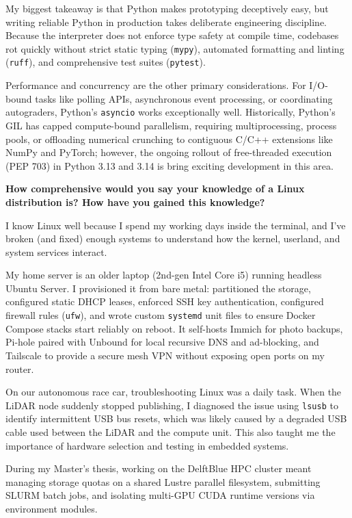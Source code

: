 \documentclass[letterpaper,11pt]{article}
\newcommand{\interviewQuestion}[1]{%
  \vspace{8pt}%
  \textbf{\color{airforceblue}#1}\par%
}
\begin{document}
My biggest takeaway is that Python makes prototyping deceptively easy, but writing reliable Python in production takes deliberate engineering discipline. Because the interpreter does not enforce type safety at compile time, codebases rot quickly without strict static typing (\texttt{mypy}), automated formatting and linting (\texttt{ruff}), and comprehensive test suites (\texttt{pytest}).

Performance and concurrency are the other primary considerations. For I/O-bound tasks like polling APIs, asynchronous event processing, or coordinating autograders, Python's \texttt{asyncio} works exceptionally well. Historically, Python's GIL has capped compute-bound parallelism, requiring multiprocessing, process pools, or offloading numerical crunching to contiguous C/C++ extensions like NumPy and PyTorch; however, the ongoing rollout of free-threaded execution (PEP 703) in Python 3.13 and 3.14 is bring exciting development in this area.

\interviewQuestion{How comprehensive would you say your knowledge of a Linux distribution is? How have you gained this knowledge?}

I know Linux well because I spend my working days inside the terminal, and I've broken (and fixed) enough systems to understand how the kernel, userland, and system services interact.

My home server is an older laptop (2nd-gen Intel Core i5) running headless Ubuntu Server. I provisioned it from bare metal: partitioned the storage, configured static DHCP leases, enforced SSH key authentication, configured firewall rules (\texttt{ufw}), and wrote custom \texttt{systemd} unit files to ensure Docker Compose stacks start reliably on reboot. It self-hosts Immich for photo backups, Pi-hole paired with Unbound for local recursive DNS and ad-blocking, and Tailscale to provide a secure mesh VPN without exposing open ports on my router.

On our autonomous race car, troubleshooting Linux was a daily task. When the LiDAR node suddenly stopped publishing, I diagnosed the issue using \texttt{lsusb} to identify intermittent USB bus resets, which was likely caused by a degraded USB cable used between the LiDAR and the compute unit. This also taught me the importance of hardware selection and testing in embedded systems.

During my Master's thesis, working on the DelftBlue HPC cluster meant managing storage quotas on a shared Lustre parallel filesystem, submitting SLURM batch jobs, and isolating multi-GPU CUDA runtime versions via environment modules.
\end{document}
